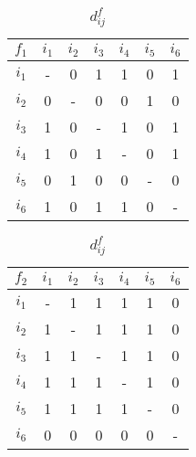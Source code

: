 \begin{table}[p]
\begin{center}
    \caption{$d_{ij}^{f}$}
    \label{tab:d_ijf}
    \begin{tabular}{ | c | c | c | c | c | c | c | } 
    \hline
     $f_1$ & $i_1$ & $i_2$ & $i_3$ & $i_4$ & $i_5$ & $i_6$  \\ \hline
     $i_1$ & -  &  0  &  1  &  1  &  0  &  1 \\ \hline
     $i_2$ & 0  &  -  &  0  &  0  &  1  &  0  \\ \hline
     $i_3$ & 1  &  0  &  -  &  1  &  0  &  1 \\ \hline
     $i_4$ & 1  &  0  &  1  &  -  &  0  &  1 \\ \hline
     $i_5$ & 0  &  1  &  0  &  0  &  -  &  0 \\ \hline
     $i_6$ & 1  &  0  &  1  &  1  &  0  &  - \\ \hline
    \end{tabular}
    \quad
    \begin{tabular}{ | c | c | c | c | c | c | c | } 
    \hline
     $f_2$ & $i_1$ & $i_2$ & $i_3$ & $i_4$ & $i_5$ & $i_6$  \\ \hline
     $i_1$ & -  &  1  &  1   & 1  &  1  &  0 \\ \hline
     $i_2$ & 1  &  -  &  1   & 1  &  1  &  0  \\ \hline
     $i_3$ & 1  &  1  &  -   & 1  &  1  &  0 \\ \hline
     $i_4$ & 1  &  1  &  1   & -  &  1  &  0 \\ \hline
     $i_5$ & 1  &  1  &  1   & 1  &  -  &  0 \\ \hline
     $i_6$ & 0  &  0  &  0   & 0  &  0  &  - \\ \hline
    \end{tabular}
    

\end{center}
\end{table}
